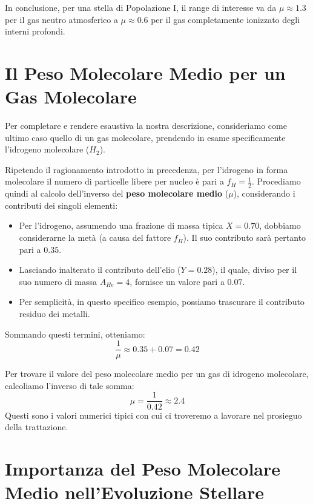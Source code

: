 In conclusione, per una stella di Popolazione I, il range di interesse va da $\mu \approx 1.3$ per il gas neutro atmosferico a $\mu \approx 0.6$ per il gas completamente ionizzato degli interni profondi.

\section{Il Peso Molecolare Medio per un Gas Molecolare}

Per completare e rendere esaustiva la nostra descrizione, consideriamo come ultimo caso quello di un gas molecolare, prendendo in esame specificamente l'idrogeno molecolare ($H_2$).

Ripetendo il ragionamento introdotto in precedenza, per l'idrogeno in forma molecolare il numero di particelle libere per nucleo è pari a $f_H = \frac{1}{2}$. Procediamo quindi al calcolo dell'inverso del \textbf{peso molecolare medio} ($\mu$), considerando i contributi dei singoli elementi:
\begin{itemize}
\item Per l'idrogeno, assumendo una frazione di massa tipica $X = 0.70$, dobbiamo considerarne la metà (a causa del fattore $f_H$). Il suo contributo sarà pertanto pari a $0.35$.
\item Lasciando inalterato il contributo dell'elio ($Y = 0.28$), il quale, diviso per il suo numero di massa $A_{He} = 4$, fornisce un valore pari a $0.07$.
\item Per semplicità, in questo specifico esempio, possiamo trascurare il contributo residuo dei metalli.
\end{itemize}

Sommando questi termini, otteniamo:
\begin{equation}
\frac{1}{\mu} \approx 0.35 + 0.07 = 0.42
\end{equation}

Per trovare il valore del peso molecolare medio per un gas di idrogeno molecolare, calcoliamo l'inverso di tale somma:
\begin{equation}
\mu = \frac{1}{0.42} \approx 2.4
\end{equation}
Questi sono i valori numerici tipici con cui ci troveremo a lavorare nel prosieguo della trattazione.

\section{Importanza del Peso Molecolare Medio nell'Evoluzione Stellare}

